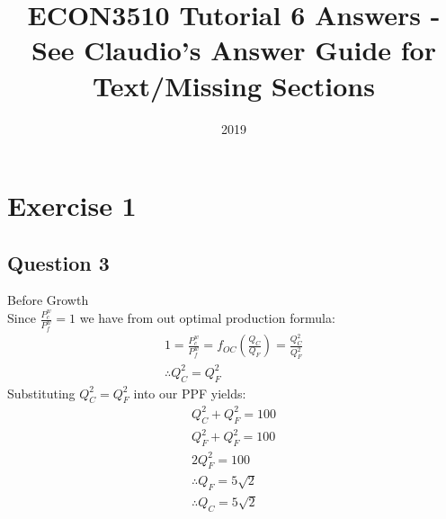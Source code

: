 \documentclass{article}
\title{ECON3510 Tutorial 6 Answers - See Claudio's Answer Guide for Text/Missing Sections}
\date{2019}
\begin{document}
\maketitle

\section{Exercise 1}
\vspace{6mm}

\par \vspace{0.8em}
\subsection{Question 3}

Before Growth \\
Since $\frac{P_{c}^{w}}{P_{f}^{w}} = 1$ we have from out optimal production formula:
\begin{gather*}
  1 = \frac{P_{c}^{w}}{P_{f}^{w}}  = f_{OC}(\frac{Q_{C}}{Q_{F}}) = \frac{Q_{C}^{2}}{Q_{F}^{2}} \\
  \therefore Q_{C}^{2} = Q_{F}^{2}
\end{gather*}
Substituting $Q_{C}^{2} = Q_{F}^{2}$ into our PPF yields:
\begin{gather*}
  Q_{C}^{2} + Q_{F}^{2} = 100 \\
  Q_{F}^{2} + Q_{F}^{2} = 100 \\
  2Q_{F}^{2} = 100 \\
  \therefore  Q_{F} = 5 \sqrt{2} \\
  \therefore  Q_{C} = 5 \sqrt{2} \\
\end{gather*}
\end{document}
